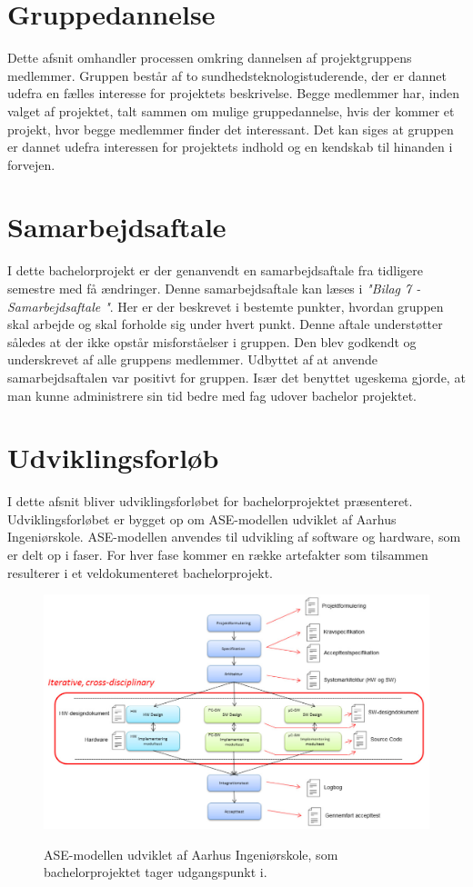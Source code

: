 \chapter{Gruppedannelse}
Dette afsnit omhandler processen omkring dannelsen af projektgruppens medlemmer. Gruppen består af to sundhedsteknologistuderende, der er dannet udefra en fælles interesse for projektets beskrivelse. Begge medlemmer har, inden valget af projektet, talt sammen om mulige gruppedannelse, hvis der kommer et projekt, hvor begge medlemmer finder det interessant. Det kan siges at gruppen er dannet udefra interessen for projektets indhold og en kendskab til hinanden i forvejen.     



\chapter{Samarbejdsaftale}
I dette bachelorprojekt er der genanvendt en samarbejdsaftale fra tidligere semestre med få ændringer. Denne samarbejdsaftale kan læses i \textit{"Bilag 7 - Samarbejdsaftale "}. Her er der beskrevet i bestemte punkter, hvordan gruppen skal arbejde og skal forholde sig under hvert punkt. Denne aftale understøtter således at der ikke opstår misforståelser i gruppen. Den blev godkendt og underskrevet af alle gruppens medlemmer. Udbyttet af at anvende samarbejdsaftalen var positivt for gruppen. Især det benyttet ugeskema gjorde, at man kunne administrere sin tid bedre med fag udover bachelor projektet. 


\chapter{Udviklingsforløb}

I dette afsnit bliver udviklingsforløbet for bachelorprojektet præsenteret. Udviklingsforløbet er bygget op om ASE-modellen\cite{IngeniorhojskolenAarhusUniversiteta} udviklet af Aarhus Ingeniørskole. ASE-modellen anvendes til udvikling af software og hardware, som er delt op i faser. For hver fase kommer en række artefakter som tilsammen resulterer i et veldokumenteret bachelorprojekt. 

\begin{figure}[H] 
\centering
{\includegraphics[width=\linewidth]
{Figure/asemodel}}
\caption{ASE-modellen udviklet af Aarhus Ingeniørskole, som bachelorprojektet tager udgangspunkt i.}
\label{asemodel}
\end{figure}




